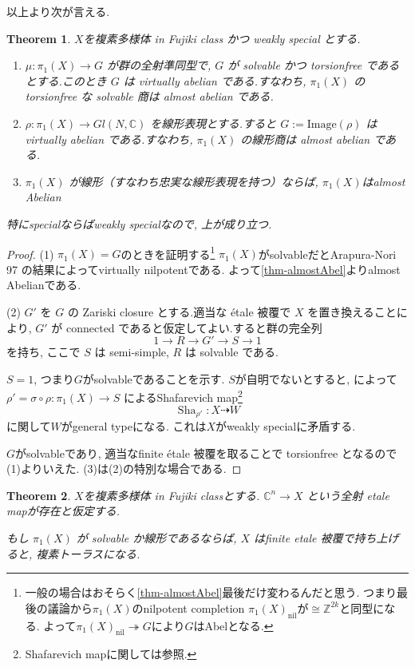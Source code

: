 \documentclass[dvipdfmx,a4paper,11pt]{article} %
\newtheorem{thm}{Theorem}[section]
\theoremstyle{definition}
\theoremstyle{remark}
\numberwithin{equation}{section}
\newcommand{\Sha}[0]{\operatorname{Sha}}
\newcommand{\Z}{\mathbb{Z}}
\begin{document}
以上より次が言える. 
\begin{thm}\cite[Corollary 7.7, 7.8, 7.10]{Cam04}
\label{thm-Cam04-7.7}
$X$を複素多様体 in Fujiki class かつ weakly special とする. 
\begin{enumerate}
\item \(\mu : \pi_1(X)\to G\) が群の全射準同型で, \(G\) が solvable かつ torsionfree であるとする.このとき \(G\) は virtually abelian である.すなわち, \(\pi_1(X)\) の torsionfree な solvable 商は almost abelian である.
\item \(\rho : \pi_1(X)\to Gl(N,\mathbb{C})\) を線形表現とする.すると \(G := \mathrm{Image}(\rho)\) は virtually abelian である.すなわち, \(\pi_1(X)\) の線形商は almost abelian である.
\item \(\pi_1(X)\) が線形（すなわち忠実な線形表現を持つ）ならば, $\pi_1(X)$はalmost Abelian
\end{enumerate}
特にspecialならばweakly specialなので, 上が成り立つ. 
\end{thm}

\begin{proof}
(1) $\pi_1(X)=G$のときを証明する\footnote{一般の場合はおそらく\ref{thm-almostAbel}最後だけ変わるんだと思う. つまり最後の議論から$\pi_1(X)$のnilpotent completion $\pi_1(X)_{\mathrm{nil}}$が$ \cong \Z^{2k}$と同型になる. よって$\pi_1(X)_{\mathrm{nil}} \twoheadrightarrow G$により$G$はAbelとなる. }
$\pi_1(X)$がsolvableだとArapura-Nori 97 の結果によってvirtually nilpotentである. 
よって\ref{thm-almostAbel}よりalmost Abelianである. 

(2) 
\(G'\) を \(G\) の Zariski closure とする.適当な étale 被覆で \(X\) を置き換えることにより, \(G'\) が connected であると仮定してよい.すると群の完全列
\[
1 \longrightarrow R \longrightarrow G' \longrightarrow S \longrightarrow 1
\]
を持ち, ここで \(S\) は semi-simple, \(R\) は solvable である.

$S=1$, つまり$G$がsolvableであることを示す. 
$S$が自明でないとすると, \cite{CCE15}によって
 \(\rho' = \sigma \circ \rho : \pi_1(X)\to S\) によるShafarevich map\footnote{Shafarevich mapに関しては\cite{Voi}参照. }
 $$
 \Sha_{\rho'} : X \dashrightarrow W
 $$
 に関して$W$がgeneral typeになる. 
 これは$X$がweakly specialに矛盾する. 

$G$がsolvableであり, 適当なfinite étale 被覆を取ることで torsionfree となるので(1)よりいえた. 
(3)は(2)の特別な場合である. 
\end{proof}



\begin{thm}\cite[Theorem 7.11, 7.12]{Cam04}
$X$を複素多様体 in Fujiki classとする.
 \(\mathbb{C}^n \to X\) という全射 etale mapが存在と仮定する. 
 
 もし \(\pi_1(X)\) が solvable か線形であるならば,  \(X\) はfinite etale 被覆で持ち上げると, 複素トーラスになる. 
\end{thm}
\end{document}
